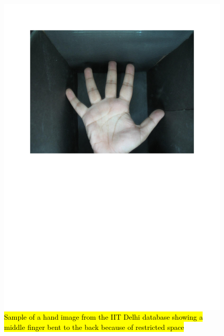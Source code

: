 \documentclass[review]{elsarticle}
\begin{document}
		\begin{figure}[!h]
			\centering
			\includegraphics[page=1,scale=.57,trim=1cm 14.7cm 1cm 1.7cm,clip]{IIT_problematic.pdf}
			\caption{\hl{Sample of a hand image from the IIT Delhi database showing a middle finger bent to the back because of restricted space}}
			\label{fig:IIT_problematic_hand1}
		\end{figure}
\end{document}
